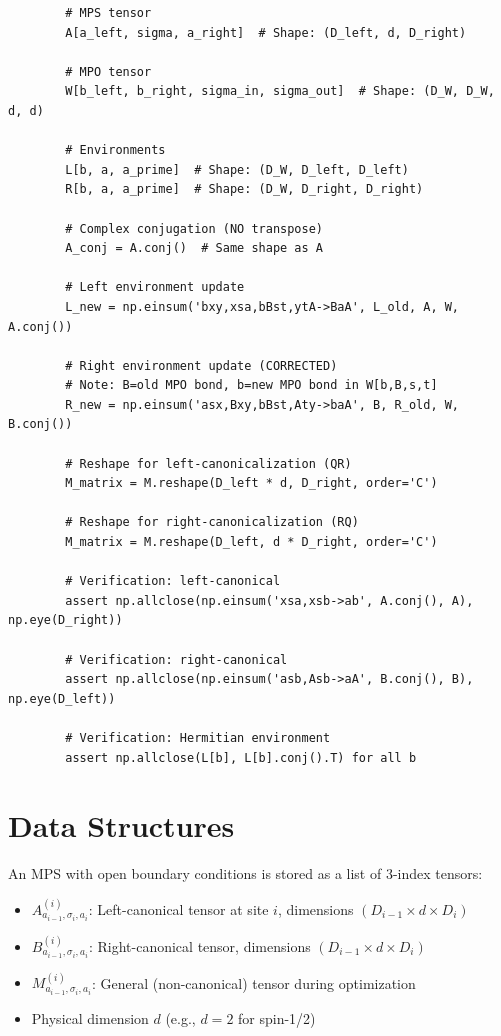 \documentclass[aps,prb,onecolumn,scriptaddress]{revtex4-2}
\begin{document}
	\begin{verbatim}
		# MPS tensor
		A[a_left, sigma, a_right]  # Shape: (D_left, d, D_right)
		
		# MPO tensor
		W[b_left, b_right, sigma_in, sigma_out]  # Shape: (D_W, D_W, d, d)
		
		# Environments
		L[b, a, a_prime]  # Shape: (D_W, D_left, D_left)
		R[b, a, a_prime]  # Shape: (D_W, D_right, D_right)
		
		# Complex conjugation (NO transpose)
		A_conj = A.conj()  # Same shape as A
		
		# Left environment update
		L_new = np.einsum('bxy,xsa,bBst,ytA->BaA', L_old, A, W, A.conj())
		
		# Right environment update (CORRECTED)  
		# Note: B=old MPO bond, b=new MPO bond in W[b,B,s,t]
		R_new = np.einsum('asx,Bxy,bBst,Aty->baA', B, R_old, W, B.conj())
		
		# Reshape for left-canonicalization (QR)
		M_matrix = M.reshape(D_left * d, D_right, order='C')
		
		# Reshape for right-canonicalization (RQ)
		M_matrix = M.reshape(D_left, d * D_right, order='C')
		
		# Verification: left-canonical
		assert np.allclose(np.einsum('xsa,xsb->ab', A.conj(), A), np.eye(D_right))
		
		# Verification: right-canonical
		assert np.allclose(np.einsum('asb,Asb->aA', B.conj(), B), np.eye(D_left))
		
		# Verification: Hermitian environment
		assert np.allclose(L[b], L[b].conj().T) for all b
		\end{verbatim}
	
	\section{Data Structures}
	
	An MPS with open boundary conditions is stored as a list of 3-index tensors:
	\begin{itemize}
		\item $A^{(i)}_{a_{i-1},\sigma_i,a_i}$: Left-canonical tensor at site $i$, dimensions $(D_{i-1} \times d \times D_i)$
		\item $B^{(i)}_{a_{i-1},\sigma_i,a_i}$: Right-canonical tensor, dimensions $(D_{i-1} \times d \times D_i)$  
		\item $M^{(i)}_{a_{i-1},\sigma_i,a_i}$: General (non-canonical) tensor during optimization
		\item Physical dimension $d$ (e.g., $d=2$ for spin-1/2)
	\end{itemize}
	
\end{document}
